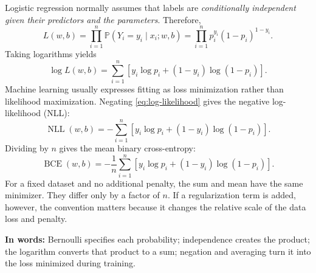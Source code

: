 \documentclass[11pt]{article}
\newcommand{\Prob}{\mathbb{P}}
\newcommand{\sigmoid}{\sigma}
\newcommand{\BCE}{\operatorname{BCE}}
\theoremstyle{definition}
\begin{document}
Logistic regression normally assumes that labels are \emph{conditionally independent given their predictors and the parameters}. Therefore,
\begin{equation}
L(w,b)
=\prod_{i=1}^{n}\Prob(Y_i=y_i\mid x_i;w,b)
=\prod_{i=1}^{n}p_i^{y_i}(1-p_i)^{1-y_i}.
\label{eq:dataset-likelihood}
\end{equation}
Taking logarithms yields
\begin{equation}
\log L(w,b)
=\sum_{i=1}^{n}\left[y_i\log p_i+(1-y_i)\log(1-p_i)\right].
\label{eq:log-likelihood}
\end{equation}
Machine learning usually expresses fitting as loss minimization rather than likelihood maximization. Negating \cref{eq:log-likelihood} gives the negative log-likelihood (NLL):
\begin{equation}
\operatorname{NLL}(w,b)
=-\sum_{i=1}^{n}\left[y_i\log p_i+(1-y_i)\log(1-p_i)\right].
\label{eq:nll}
\end{equation}
Dividing by $n$ gives the mean binary cross-entropy:
\begin{equation}
\boxed{
\BCE(w,b)
=-\frac{1}{n}\sum_{i=1}^{n}
\left[y_i\log p_i+(1-y_i)\log(1-p_i)\right].}
\label{eq:bce-dataset}
\end{equation}
For a fixed dataset and no additional penalty, the sum and mean have the same minimizer. They differ only by a factor of $n$. If a regularization term is added, however, the convention matters because it changes the relative scale of the data loss and penalty.

\begin{keyidea}
\centering
{}

\par\vspace{5pt}
\raggedright
\textbf{In words:} Bernoulli specifies each probability; independence creates the product; the logarithm converts that product to a sum; negation and averaging turn it into the loss minimized during training.
\end{keyidea}
\end{document}
